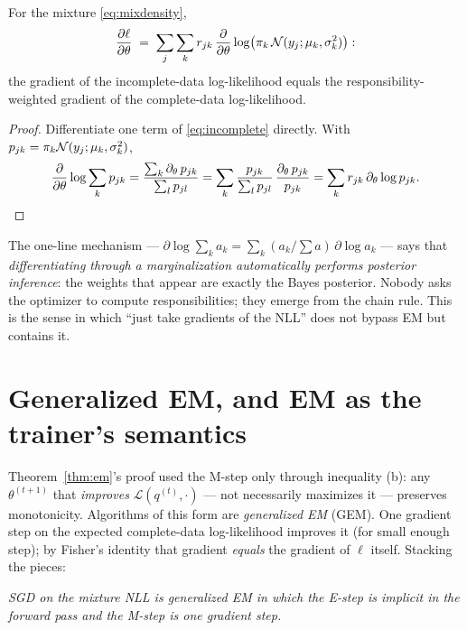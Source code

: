 \begin{proposition}\label{prop:fisher}
For the mixture \eqref{eq:mixdensity},
\begin{equation}\label{eq:fisher}
  \frac{\partial \ell}{\partial \theta}
  \;=\; \sum_j \sum_k r_{jk}\,
  \frac{\partial}{\partial \theta}
  \log\bigl(\pi_k\, \mathcal{N}(y_j; \mu_k, \sigma_k^2)\bigr):
\end{equation}
the gradient of the incomplete-data log-likelihood equals the
responsibility-weighted gradient of the complete-data log-likelihood.
\end{proposition}

\begin{proof}
Differentiate one term of \eqref{eq:incomplete} directly. With
$p_{jk} = \pi_k \mathcal{N}(y_j; \mu_k, \sigma_k^2)$,
\[
  \frac{\partial}{\partial \theta} \log \sum_k p_{jk}
  = \frac{\sum_k \partial_\theta\, p_{jk}}{\sum_l p_{jl}}
  = \sum_k \frac{p_{jk}}{\sum_l p_{jl}}\,
    \frac{\partial_\theta\, p_{jk}}{p_{jk}}
  = \sum_k r_{jk}\, \partial_\theta \log p_{jk}. \qedhere
\]
\end{proof}

The one-line mechanism --- $\partial \log \sum_k a_k = \sum_k
(a_k/\sum a)\, \partial \log a_k$ --- says that \emph{differentiating
through a marginalization automatically performs posterior inference}: the
weights that appear are exactly the Bayes posterior. Nobody asks the
optimizer to compute responsibilities; they emerge from the chain rule.
This is the sense in which ``just take gradients of the NLL'' does not
bypass EM but contains it.

\section{Generalized EM, and EM as the trainer's semantics}
\label{sec:generalizedem}

Theorem~\ref{thm:em}'s proof used the M-step only through inequality (b):
any $\theta^{(t+1)}$ that \emph{improves} $\mathcal{L}(q^{(t)}, \cdot)$
--- not necessarily maximizes it --- preserves monotonicity. Algorithms of
this form are \emph{generalized EM} (GEM). One gradient step on the
expected complete-data log-likelihood improves it (for small enough step);
by Fisher's identity that gradient \emph{equals} the gradient of $\ell$
itself. Stacking the pieces:

\begin{center}
\emph{SGD on the mixture NLL is generalized EM in which the E-step is
implicit in the forward pass and the M-step is one gradient step.}
\end{center}


